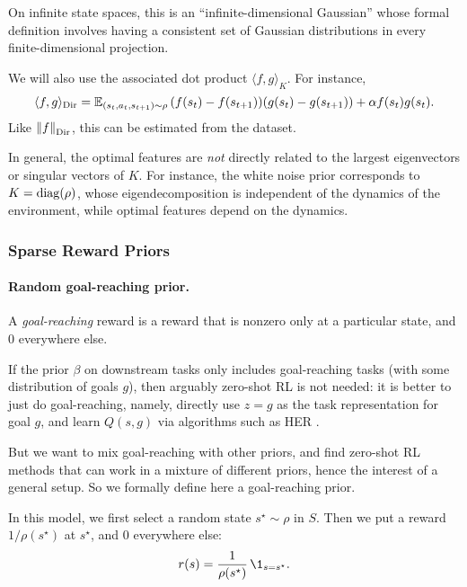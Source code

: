 \documentclass[11pt,a4paper]{article}
\newcommand{\TODO}[1]{{\color{red} TODO: {#1}}}
\newcommand{\Dir}{_\mathrm{Dir}}
\begin{document}
On infinite state spaces, this is an ``infinite-dimensional Gaussian''
whose formal definition involves having a consistent set of Gaussian
distributions in every finite-dimensional projection.%

We will also use the associated dot
product $\langle{f,g}\rangle_K$. For instance,
\begin{equation}
\langle{f,g}\rangle\Dir=\E_{(s_t,a_t,s_{t+1})\sim
\rho}\,(f(s_t)-f(s_{t+1}))(g(s_t)-g(s_{t+1}))+\alpha f(s_t)g(s_t).
\end{equation}
Like $\norm{f}\Dir$, this can be estimated from the dataset.

\begin{rem}
In general, the optimal features are \emph{not} directly related to the
largest eigenvectors or singular vectors of $K$. For instance, the white
noise prior corresponds to $K=\operatorname{diag}(\rho)$, whose eigendecomposition is
independent of the dynamics of the environment, while optimal features
depend on the dynamics.
\end{rem}

\subsubsection{Sparse Reward Priors}
\label{sec:sparsepriors}

\paragraph{Random goal-reaching prior.} A \emph{goal-reaching} reward is
a reward that is nonzero only at a particular state, and $0$ everywhere
else.

If the prior $\beta$ on downstream tasks only includes goal-reaching
tasks (with some distribution of goals $g$), then arguably zero-shot RL
is not needed: it is better to just do goal-reaching, namely, directly
use $z=g$ as the task representation for goal $g$, and learn $Q(s,g)$ via
algorithms such as HER \cite{andrychowicz2017hindsight}.

But we want to mix goal-reaching with other priors, and find zero-shot RL
methods that can work in a mixture of different priors, hence the
interest of a general setup. So we formally define here a goal-reaching
prior.

In this model, we first
select a random state $s^\star\sim \rho$ in $S$. Then we put
a reward $1/\rho(s^\star)$ at $s^\star$, and $0$
everywhere else:
\begin{equation}
\label{eq:goalreaching}
r(s)=\frac{1}{\rho(s^\star)} \,\1_{s=s^\star}.
\end{equation}
\end{document}
